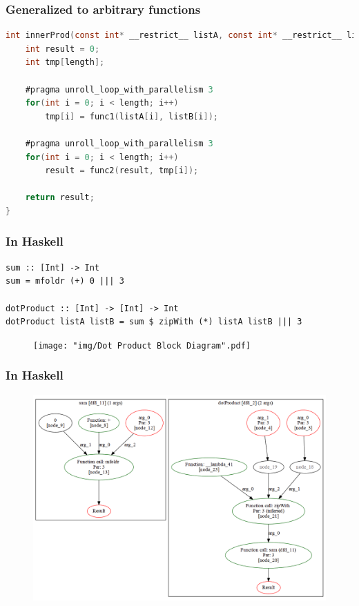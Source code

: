 \documentclass{beamer}
\begin{document}
\begin{frame}[fragile]
    \frametitle{Generalized to arbitrary functions}

\begin{lstlisting}[language=C]
int innerProd(const int* __restrict__ listA, const int* __restrict__ listB, int length){
    int result = 0;
    int tmp[length];

    #pragma unroll_loop_with_parallelism 3
    for(int i = 0; i < length; i++)
        tmp[i] = func1(listA[i], listB[i]);

    #pragma unroll_loop_with_parallelism 3
    for(int i = 0; i < length; i++)
        result = func2(result, tmp[i]);

    return result;
}
\end{lstlisting}
\end{frame}

\begin{frame}[fragile]
    \frametitle{In Haskell}

\begin{lstlisting}
sum :: [Int] -> Int
sum = mfoldr (+) 0 ||| 3

dotProduct :: [Int] -> [Int] -> Int
dotProduct listA listB = sum $ zipWith (*) listA listB ||| 3
\end{lstlisting}

\begin{figure}
    \texttt{[image: "img/Dot Product Block Diagram".pdf]}
\end{figure}
\end{frame}

\begin{frame}
    \frametitle{In Haskell}
    \begin{figure}
        \includegraphics[keepaspectratio=true,scale=0.25]{img/dotProduct.png}
    \end{figure}
\end{frame}
\end{document}
